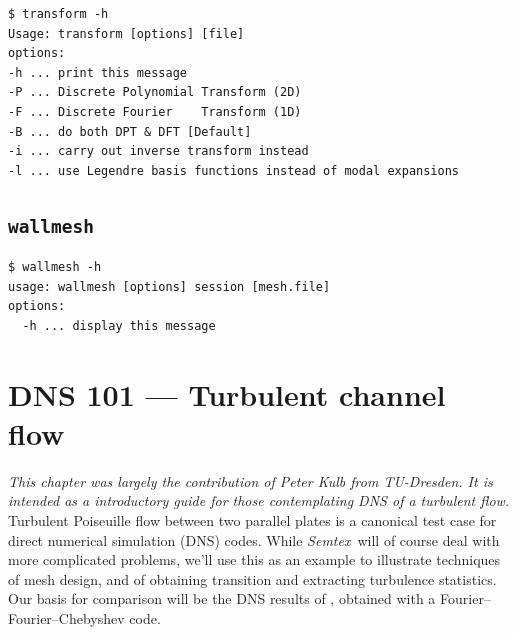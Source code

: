 \documentclass[11pt]{report}
\newcommand{\Semtex}{\emph{Semtex}} \newcommand{\Dog}{\emph{Dog}}
\begin{document}
{\small
\begin{verbatim}
$ transform -h
Usage: transform [options] [file]
options:
-h ... print this message
-P ... Discrete Polynomial Transform (2D)
-F ... Discrete Fourier    Transform (1D)
-B ... do both DPT & DFT [Default]
-i ... carry out inverse transform instead
-l ... use Legendre basis functions instead of modal expansions
\end{verbatim}
}
%

\section{\texttt{wallmesh}}
\label{sec.wallmesh}

{\small
\begin{verbatim}
$ wallmesh -h
usage: wallmesh [options] session [mesh.file]
options:
  -h ... display this message
\end{verbatim}
}
%





\chapter{DNS 101 --- Turbulent channel flow}
\label{ch.dns101}

\textsl{This chapter was largely the contribution of Peter Kulb from
  TU-Dresden.  It is intended as a introductory guide for those
  contemplating DNS of a turbulent flow.}\\

Turbulent Poiseuille flow between two parallel plates is a canonical
test case for direct numerical simulation (DNS) codes.  While
\Semtex\ will of course deal with more complicated problems, we'll use
this as an example to illustrate techniques of mesh design, and of
obtaining transition and extracting turbulence statistics.  Our basis
for comparison will be the DNS results of \citet*{kmm87}, obtained
with a Fourier--Fourier--Chebyshev code.
\end{document}
